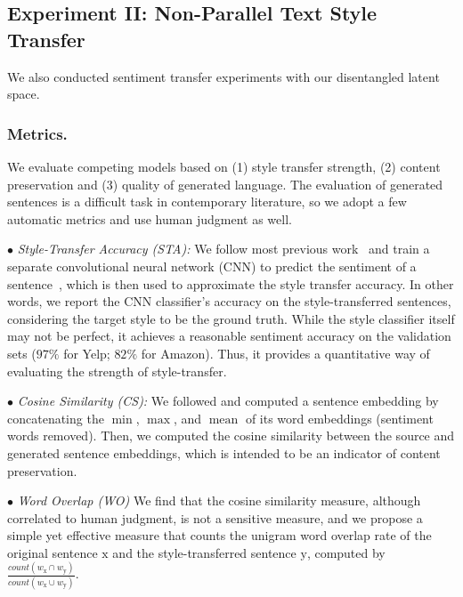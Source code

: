 \documentclass[letterpaper]{article} %
\begin{document}
\subsection{Experiment II: Non-Parallel Text Style Transfer}
We also conducted sentiment transfer experiments with our disentangled latent space.

\subsubsection{Metrics.} We evaluate competing models based on (1) style transfer strength, (2) content preservation and (3) quality of generated language. The evaluation of generated sentences is a difficult task in contemporary literature, so we adopt a few automatic metrics and use human judgment as well.

$\bullet$ \textit{Style-Transfer Accuracy (STA):}
We follow most previous work~\cite{hu2017toward,shen2017style,fu2018style} and train a separate convolutional neural network (CNN) to predict the sentiment of a sentence~\cite{kim2014convolutional}, which is then used to approximate the style transfer accuracy.
In other words, we report the CNN classifier's accuracy on the style-transferred sentences, considering the target style to be the ground truth.
While the style classifier itself may not be perfect, it achieves a reasonable sentiment accuracy on the validation sets ($97\%$ for Yelp; $82\%$ for Amazon).
Thus, it provides a quantitative way of evaluating the strength of style-transfer.

$\bullet$ \textit{Cosine Similarity (CS):}
We followed \citet{fu2018style} and computed a sentence embedding by concatenating the $\operatorname{min}$, $\operatorname{max}$, and $\operatorname{mean}$ of its word embeddings (sentiment words removed).
Then, we computed the cosine similarity between the source and generated sentence embeddings, which is intended to be an indicator of content preservation.

$\bullet$ \textit{Word Overlap (WO)}
We find that the cosine similarity measure, although correlated to human judgment, is not a sensitive measure, and we propose a simple yet effective measure that counts the unigram word overlap rate of the original sentence $\mathrm x$ and the style-transferred sentence $\mathrm y$, computed by $\frac{count(w_{\mathrm x} \cap w_{\mathrm y})}{count(w_{\mathrm x} \cup w_{\mathrm y})}$.

\end{document}
